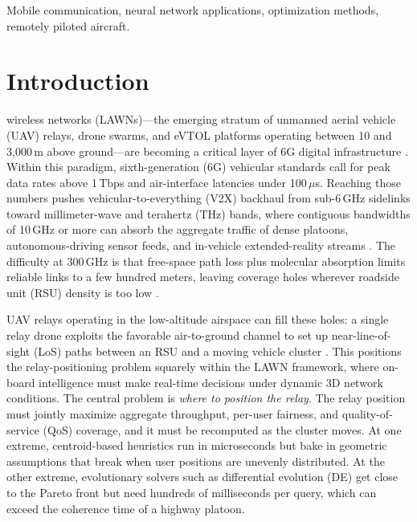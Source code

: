 \documentclass[journal]{IEEEtran}
\begin{document}
\begin{IEEEkeywords}
Mobile communication, neural network applications, optimization methods, remotely piloted aircraft.
\end{IEEEkeywords}


\section{Introduction}
\label{sec:introduction}

 wireless networks (LAWNs)---the emerging stratum of unmanned aerial vehicle (UAV) relays, drone swarms, and eVTOL platforms operating between 10 and 3{,}000\,m above ground---are becoming a critical layer of 6G digital infrastructure \cite{rappaport2019}. Within this paradigm, sixth-generation (6G) vehicular standards call for peak data rates above 1\,Tbps and air-interface latencies under 100\,$\mu$s. Reaching those numbers pushes vehicular-to-everything (V2X) backhaul from sub-6\,GHz sidelinks toward millimeter-wave and terahertz (THz) bands, where contiguous bandwidths of 10\,GHz or more can absorb the aggregate traffic of dense platoons, autonomous-driving sensor feeds, and in-vehicle extended-reality streams \cite{akyildiz2022, chaccour2022}. The difficulty at 300\,GHz is that free-space path loss plus molecular absorption limits reliable links to a few hundred meters, leaving coverage holes wherever roadside unit (RSU) density is too low \cite{sarieddeen2021}.

UAV relays operating in the low-altitude airspace can fill these holes: a single relay drone exploits the favorable air-to-ground channel to set up near-line-of-sight (LoS) paths between an RSU and a moving vehicle cluster \cite{zeng2016wireless}. This positions the relay-positioning problem squarely within the LAWN framework, where on-board intelligence must make real-time decisions under dynamic 3D network conditions. The central problem is \emph{where to position the relay}. The relay position must jointly maximize aggregate throughput, per-user fairness, and quality-of-service (QoS) coverage, and it must be recomputed as the cluster moves. At one extreme, centroid-based heuristics \cite{zeng2016throughput} run in microseconds but bake in geometric assumptions that break when user positions are unevenly distributed. At the other extreme, evolutionary solvers such as differential evolution (DE) \cite{storn1997} get close to the Pareto front but need hundreds of milliseconds per query, which can exceed the coherence time of a highway platoon.
\end{document}
